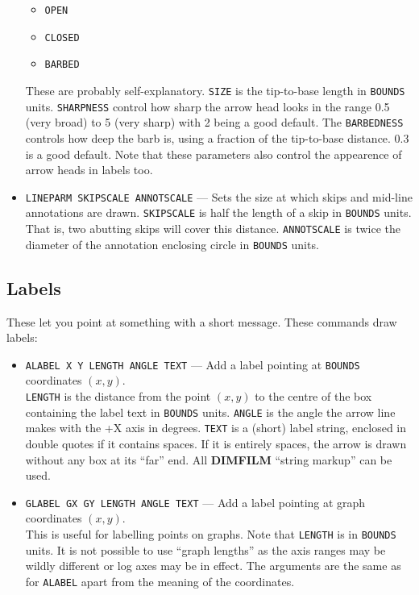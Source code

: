 \documentclass[a4paper,twoside,11pt]{article}
\newcommand{\textttc}[1]{\texttt{\textcolor{OurRed}{#1}}}
\begin{document}
\begin{itemize}
  \begin{itemize}
  \item \texttt{OPEN}
  \item \texttt{CLOSED}
  \item \texttt{BARBED}
  \end{itemize}
  These are probably self-explanatory. \texttt{SIZE} is the tip-to-base length in \texttt{BOUNDS} units.
  \texttt{SHARPNESS} control how sharp the arrow head looks in the range 0.5 (very broad) to 5 (very sharp) with 2 being
  a good default. The \texttt{BARBEDNESS} controls how deep the barb is, using a fraction of the tip-to-base distance. 0.3
  is a good default. Note that these parameters also control the appearence of arrow heads in labels too.
\item \textttc{LINEPARM SKIPSCALE ANNOTSCALE} --- Sets the size at which skips and mid-line annotations are drawn.
  \texttt{SKIPSCALE} is half the length of a skip in \texttt{BOUNDS} units. That is, two abutting skips will cover this distance.
  \texttt{ANNOTSCALE} is twice the diameter of the annotation enclosing circle in \texttt{BOUNDS} units.
\end{itemize}

\subsection{Labels}\label{labels-sect}
These let you point at something with a short message. These commands draw labels:
\begin{itemize}
\item \textttc{ALABEL X Y LENGTH ANGLE TEXT} --- Add a label pointing at \texttt{BOUNDS} coordinates $(x,y)$.\\
  \texttt{LENGTH} is the distance from the point $(x,y)$ to the centre of the box containing the label text in \texttt{BOUNDS} units.
  \texttt{ANGLE} is the angle the arrow line makes with the +X axis in degrees.
  \texttt{TEXT} is a (short) label string, enclosed in double quotes if it contains spaces. If it is entirely spaces, the arrow
  is drawn without any box at its ``far'' end. All \textbf{DIMFILM} ``string markup'' can be used.
\item \textttc{GLABEL GX GY LENGTH ANGLE TEXT} --- Add a label pointing at graph coordinates $(x,y)$.\\
  This is useful for labelling points on graphs. Note that \texttt{LENGTH} is in \texttt{BOUNDS} units. It is not possible to use ``graph
  lengths'' as the axis ranges may be wildly different or log axes may be in effect. The arguments are the same as
  for \texttt{ALABEL} apart from the meaning of the coordinates.
\end{itemize}
\end{document}

